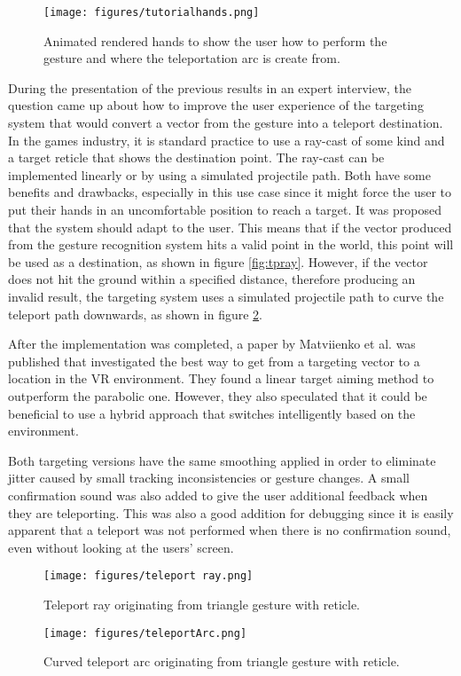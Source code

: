 \begin{figure}[!ht]
    \centering
    \texttt{[image: figures/tutorialhands.png]}
    \caption{Animated rendered hands to show the user how to perform the gesture and where the teleportation arc is create from.}
    \label{fig:tutorial}
\end{figure}

During the presentation of the previous results in an expert interview, the question came up about how to improve the user experience of the targeting system that would convert a vector from the gesture into a teleport destination. In the games industry, it is standard practice to use a ray-cast of some kind and a target reticle that shows the destination point. The ray-cast can be implemented linearly or by using a simulated projectile path. Both have some benefits and drawbacks, especially in this use case since it might force the user to put their hands in an uncomfortable position to reach a target. It was proposed that the system should adapt to the user. This means that if the vector produced from the gesture recognition system hits a valid point in the world, this point will be used as a destination, as shown in figure \ref{fig:tpray}. However, if the vector does not hit the ground within a specified distance, therefore producing an invalid result, the targeting system uses a simulated projectile path to curve the teleport path downwards, as shown in figure \ref{fig:tparc}.

After the implementation was completed, a paper by Matviienko et al. \cite{Andrii2022} was published that investigated the best way to get from a targeting vector to a location in the VR environment. They found a linear target aiming method to outperform the parabolic one. However, they also speculated that it could be beneficial to use a hybrid approach that switches intelligently based on the environment. 

Both targeting versions have the same smoothing applied in order to eliminate jitter caused by small tracking inconsistencies or gesture changes. A small confirmation sound was also added to give the user additional feedback when they are teleporting. This was also a good addition for debugging since it is easily apparent that a teleport was not performed when there is no confirmation sound, even without looking at the users' screen. 

\begin{figure}[!htb]
        \texttt{[image: figures/teleport ray.png]}
        \caption{Teleport ray originating from triangle gesture with reticle.}
        \label{fig:tpray}
    \endminipage\hfill
        \texttt{[image: figures/teleportArc.png]}
        \caption{Curved teleport arc originating from triangle gesture with reticle.}
        \label{fig:tparc}
    \endminipage\hfill
\end{figure}